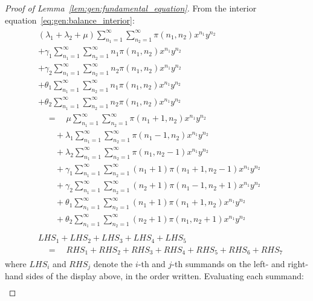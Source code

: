 \begin{proof}[Proof of Lemma~\ref{lem:gen:fundamental_equation}]
    From the interior equation~\eqref{eq:gen:balance_interior}:
    \begin{align*}
        \begin{split}
            & (\lambda_1 + \lambda_2 + \mu) \sum_{n_1=1}^{\infty} \sum_{n_2=1}^{\infty} \pi(n_1,n_2) x^{n_1}y^{n_2} \\
            &+ \gamma_1 \sum_{n_1=1}^{\infty} \sum_{n_2=1}^{\infty} n_1 \pi(n_1,n_2) x^{n_1}y^{n_2} \\
            &+ \gamma_2 \sum_{n_1=1}^{\infty} \sum_{n_2=1}^{\infty} n_2 \pi(n_1,n_2) x^{n_1}y^{n_2} \\
            &+ \theta_1 \sum_{n_1=1}^{\infty} \sum_{n_2=1}^{\infty} n_1 \pi(n_1,n_2) x^{n_1}y^{n_2} \\
            &+ \theta_2 \sum_{n_1=1}^{\infty} \sum_{n_2=1}^{\infty} n_2 \pi(n_1,n_2) x^{n_1}y^{n_2} \\
            &\quad = \quad \mu \sum_{n_1=1}^{\infty} \sum_{n_2=1}^{\infty} \pi(n_1+1,n_2)x^{n_1}y^{n_2} \\
            &\quad\quad  + \lambda_1 \sum_{n_1=1}^{\infty} \sum_{n_2=1}^{\infty} \pi(n_1-1,n_2)x^{n_1}y^{n_2} \\
            &\quad\quad + \lambda_2 \sum_{n_1=1}^{\infty} \sum_{n_2=1}^{\infty} \pi(n_1,n_2-1)x^{n_1}y^{n_2} \\
            &\quad\quad + \gamma_1 \sum_{n_1=1}^{\infty} \sum_{n_2=1}^{\infty} (n_1+1)\pi(n_1+1,n_2-1)x^{n_1}y^{n_2} \\
            &\quad\quad + \gamma_2 \sum_{n_1=1}^{\infty} \sum_{n_2=1}^{\infty} (n_2+1)\pi(n_1-1,n_2+1)x^{n_1}y^{n_2} \\
            &\quad\quad + \theta_1 \sum_{n_1=1}^{\infty} \sum_{n_2=1}^{\infty} (n_1+1)\pi(n_1+1,n_2)x^{n_1}y^{n_2} \\
            &\quad\quad + \theta_2 \sum_{n_1=1}^{\infty} \sum_{n_2=1}^{\infty} (n_2+1)\pi(n_1,n_2+1)x^{n_1}y^{n_2}
        \end{split} \\
        \begin{split}
            & LHS_1 + LHS_2 + LHS_3 + LHS_4 + LHS_5 \\
            & \quad = \quad RHS_1 + RHS_2 + RHS_3 + RHS_4 + RHS_5 + RHS_6 + RHS_7
        \end{split}
    \end{align*}
    where $LHS_i$ and $RHS_j$ denote the $i$-th and $j$-th summands on the left- and right-hand sides of the display above, in the order written. Evaluating each summand:
    \begin{align*}

\end{align*}
\end{proof}
